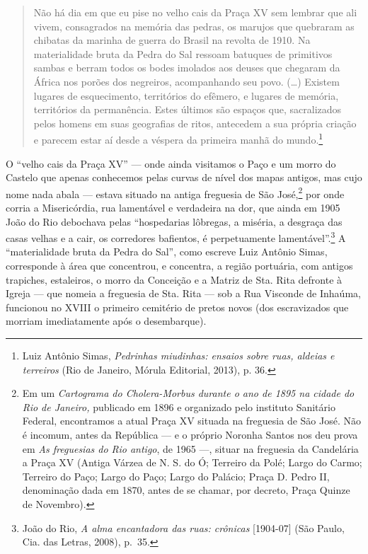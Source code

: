 \begin{quote}
Não há dia em que eu pise no velho cais da Praça XV sem lembrar que ali
vivem, consagrados na memória das pedras, os marujos que quebraram as
chibatas da marinha de guerra do Brasil na revolta de 1910. Na
materialidade bruta da Pedra do Sal ressoam batuques de primitivos
sambas e berram todos os bodes imolados aos deuses que chegaram da
África nos porões dos negreiros, acompanhando seu povo. (\ldots{})
Existem lugares de esquecimento, territórios do efêmero, e lugares de
memória, territórios da permanência. Estes últimos são espaços que,
sacralizados pelos homens em suas geografias de ritos, antecedem a sua
própria criação e parecem estar aí desde a véspera da primeira manhã do
mundo.\footnote{Luiz Antônio Simas, \textit{Pedrinhas miudinhas: ensaios
  sobre ruas, aldeias e terreiros} (Rio de Janeiro, Mórula Editorial,
  2013), p. 36.}
\end{quote}

O ``velho cais da Praça XV'' --- onde ainda visitamos o Paço e um morro
do Castelo que apenas conhecemos pelas curvas de nível dos mapas
antigos, mas cujo nome nada abala --- estava situado na antiga freguesia
de São José,\footnote{Em um \textit{Cartograma do Cholera-Morbus durante o
  ano de 1895 na cidade do Rio de Janeiro,} publicado em 1896 e
  organizado pelo instituto Sanitário Federal, encontramos a atual Praça
  XV situada na freguesia de São José. Não é incomum, antes da República
  --- e o próprio Noronha Santos nos deu prova em \textit{As freguesias do
  Rio antigo}, de 1965 ---, situar na freguesia da Candelária a Praça XV
  (Antiga Várzea de N. S. do Ó; Terreiro da Polé; Largo do Carmo;
  Terreiro do Paço; Largo do Paço; Largo do Palácio; Praça D. Pedro II,
  denominação dada em 1870, antes de se chamar, por decreto, Praça
  Quinze de Novembro).} por onde corria a Misericórdia, rua lamentável e
verdadeira na dor, que ainda em 1905 João do Rio debochava pelas
``hospedarias lôbregas, a miséria, a desgraça das casas velhas e a cair,
os corredores bafientos, é perpetuamente lamentável''.\footnote{João do
  Rio, \textit{A alma encantadora das ruas: crônicas} {[}1904-07{]} (São
  Paulo, Cia. das Letras, 2008), p.~35.} A ``materialidade bruta da
Pedra do Sal'', como escreve Luiz Antônio Simas, corresponde à área que
concentrou, e concentra, a região portuária, com antigos trapiches,
estaleiros, o morro da Conceição e a Matriz de Sta. Rita defronte à
Igreja --- que nomeia a freguesia de Sta. Rita --- sob a Rua Visconde de
Inhaúma, funcionou no XVIII o primeiro cemitério de pretos novos (dos
escravizados que morriam imediatamente após o desembarque).

